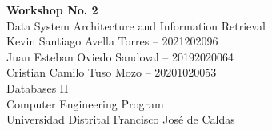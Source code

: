 \begin{titlepage}
    \thispagestyle{empty}
    \vspace*{\fill}
    \begin{center}
        {\LARGE \textbf{Workshop No. 2} \\[0.5cm]}
        {\Large Data System Architecture and
 Information Retrieval \\[2cm]}
        {\large
        Kevin Santiago Avella Torres -- 2021202096 \\[0.3cm]
        Juan Esteban Oviedo Sandoval -- 20192020064 \\[0.3cm]
        Cristian Camilo Tuso Mozo -- 20201020053 \\[2cm]
        }
        {\large Databases II \\[0.3cm]
        Computer Engineering Program \\[0.3cm]
        Universidad Distrital Francisco José de Caldas \\}
    \end{center}
    \vspace*{\fill}
\end{titlepage}
